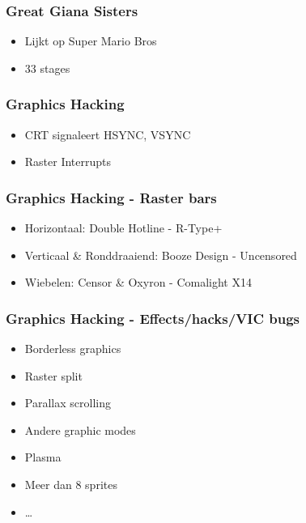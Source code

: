 
\begin{frame}
\frametitle{Great Giana Sisters}

\begin{itemize}
\item Lijkt op Super Mario Bros
\item 33 stages
\end{itemize}

\end{frame}


\begin{frame}
\frametitle{Graphics Hacking}

\begin{itemize}
\item CRT signaleert HSYNC, VSYNC
\item Raster Interrupts
\end{itemize}

\end{frame}


\begin{frame}
\frametitle{Graphics Hacking - Raster bars}

\begin{itemize}
\item Horizontaal: Double Hotline - R-Type+
\item Verticaal \& Ronddraaiend: Booze Design - Uncensored
\item Wiebelen: Censor \& Oxyron - Comalight X14
\end{itemize}

\end{frame}


\begin{frame}
\frametitle{Graphics Hacking - Effects/hacks/VIC bugs}

\begin{itemize}
\item Borderless graphics
\item Raster split
\item Parallax scrolling
\item Andere graphic modes
\item Plasma
\item Meer dan 8 sprites
\item \dots
\end{itemize}

\end{frame}

